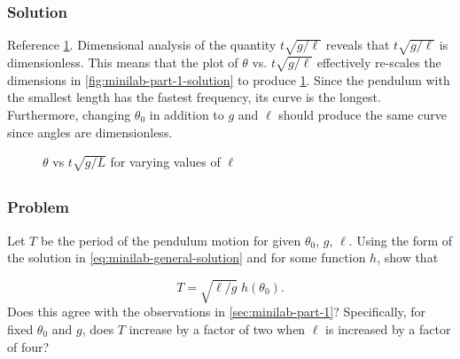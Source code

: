 \documentclass[12pt]{article}
\begin{document}
  \subsubsection*{Solution}
  Reference \cref{fig:minilab-part-2-solution}. Dimensional analysis of the quantity
  $t\sqrt{g/\ell}$ reveals that $t\sqrt{g/\ell}$ is dimensionless. This means
  that the plot of $\theta$ vs. $t\sqrt{g/\ell}$ effectively re-scales the
  dimensions in \cref{fig:minilab-part-1-solution} to produce \cref{fig:minilab-part-2-solution}.
  Since the pendulum with the smallest length has the fastest frequency, its
  curve is the longest. Furthermore, changing $\theta_0$ in addition to $g$ and
  $\ell$ should produce the same curve since angles are dimensionless.

  \begin{figure}
    \centering
    \caption{$\theta$ vs $t\sqrt{g/L}$ for varying values of $\ell$}
\label{fig:minilab-part-2-solution}
  \end{figure}

\subsection{}
  \subsubsection*{Problem}
  Let $T$ be the period of the pendulum motion for given $\theta_0$, $g$,
  $\ell$. Using the form of the solution in \cref{eq:minilab-general-solution}
  and for some function $h$, show that

  \begin{equation}
    \label{eq:2-3-prob}
    T=\sqrt{\ell/g}\;h(\theta_0).
  \end{equation}
  Does this agree with the observations in \cref{sec:minilab-part-1}?
  Specifically, for fixed $\theta_0$ and $g$, does $T$ increase by a factor of
  two when $\ell$ is increased by a factor of four?
\end{document}
